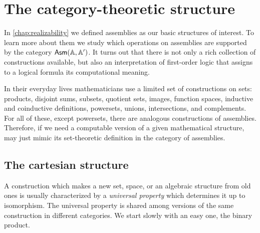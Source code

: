 \chapter{The category-theoretic structure}
\label{cha:categ-structure}


In \cref{chap:realizability} we defined assemblies as our basic
structures of interest. To learn more about them we study which
operations on assemblies are supported by the category $\mathsf{Asm}(\mathbb{A},\mathbb{A}')$. It
turns out that there is not only a rich collection of constructions
available, but also an interpretation of first-order logic that
assigns to a logical formula its computational meaning.


In their everyday lives mathematicians use a limited set of
constructions on sets: products, disjoint sums, subsets, quotient
sets, images, function spaces, inductive and coinductive definitions,
powersets, unions, intersections, and complements. For all of these,
except powersets, there are analogous constructions of assemblies.
Therefore, if we need a computable version of a given mathematical
structure, may just mimic its set-theoretic definition in the
category of assemblies.

\section{The cartesian structure}
\label{sec:cartesian-structure}

A construction which makes a new set, space, or an algebraic structure
from old ones is usually characterized by a \emph{universal property}
which determines it up to isomorphism. The universal property is
shared among versions of the same construction in different
categories. We start slowly with an easy one, the binary product.

